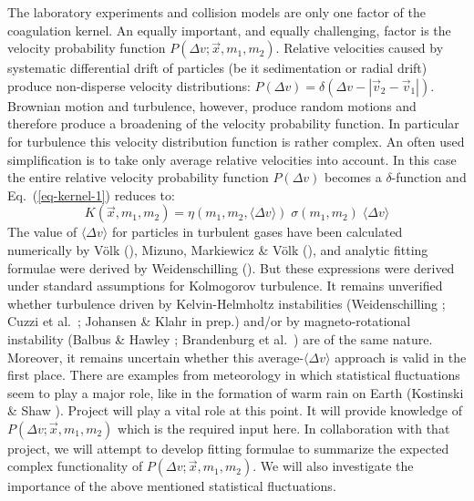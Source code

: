 The laboratory experiments and collision models are only one factor of the
coagulation kernel. An equally important, and equally challenging, factor is
the velocity probability function $P(\Delta v;\vec x,m_1,m_2)$.  Relative
velocities caused by systematic differential drift of particles (be it
sedimentation or radial drift) produce non-disperse velocity distributions:
$P(\Delta v)=\delta(\Delta v-|\vec v_2-\vec v_1|)$. Brownian motion and
turbulence, however, produce random motions and therefore produce a
broadening of the velocity probability function. In particular for
turbulence this velocity distribution function is rather complex. An often
used simplification is to take only average relative velocities into
account. In this case the entire relative velocity probability function
$P(\Delta v)$ becomes a $\delta$-function and Eq.~(\ref{eq-kernel-1})
reduces to:
\begin{equation}\label{eq-kernel-2}
K(\vec x, m_1, m_2) = \eta(m_1,m_2,\langle\Delta v\rangle)\;
\sigma(m_1,m_2)\; \langle\Delta v\rangle
\end{equation}
The value of $\langle\Delta v\rangle$ for particles in turbulent gases have
been calculated numerically by V\"olk (), Mizuno, Markiewicz \&
V\"olk (), and analytic fitting formulae were derived by
Weidenschilling (). But these expressions were derived under
standard assumptions for Kolmogorov turbulence. It remains unverified
whether turbulence driven by Kelvin-Helmholtz instabilities (Weidenschilling
; Cuzzi et al.~; Johansen \& Klahr in prep.) and/or by
magneto-rotational instability (Balbus \& Hawley ; Brandenburg et
al.~) are of the same nature.  Moreover, it remains uncertain
whether this average-$\langle\Delta v\rangle$ approach is valid in the first
place. There are examples from meteorology in which statistical fluctuations
seem to play a major role, like in the formation of warm rain on Earth
(Kostinski \& Shaw ). Project \projklahr{} will play a vital role
at this point. It will provide knowledge of $P(\Delta v;\vec x,m_1,m_2)$
which is the required input here. In collaboration with that project, we
will attempt to develop fitting formulae to summarize the expected complex
functionality of $P(\Delta v;\vec x,m_1,m_2)$. We will also investigate the
importance of the above mentioned statistical fluctuations.

